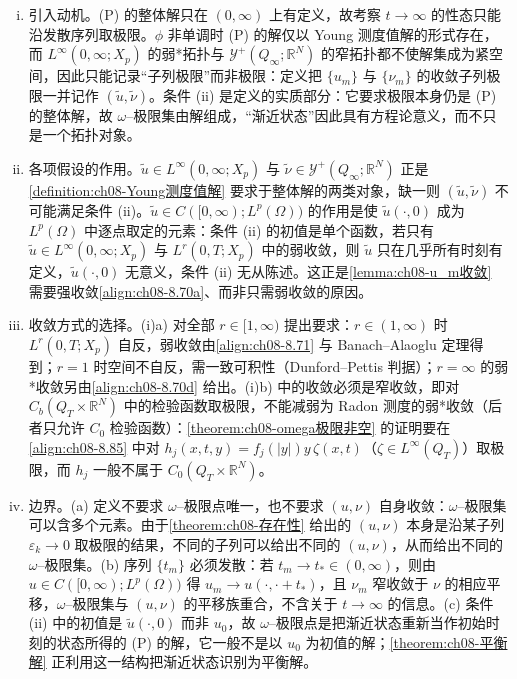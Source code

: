 \documentclass[../../main.tex]{subfiles}%
\begin{document}
\begin{remark}\label{remark:ch08-omega极限点}
\begin{enumerate}[(i)]
\item 引入动机。(P) 的整体解只在 $(0,\infty)$ 上有定义，故考察 $t\to\infty$ 的性态只能沿发散序列取极限。$\phi$ 非单调时 (P) 的解仅以 Young 测度值解的形式存在，而 $L^\infty(0,\infty;X_p)$ 的弱*拓扑与 $\mathcal{Y}^+(Q_\infty;\mathbb{R}^N)$ 的窄拓扑都不使解集成为紧空间，因此只能记录“子列极限”而非极限：定义把 $\{u_m\}$ 与 $\{\nu_m\}$ 的收敛子列极限一并记作 $(\tilde u,\tilde\nu)$。条件 (ii) 是定义的实质部分：它要求极限本身仍是 (P) 的整体解，故 $\omega$--极限集由解组成，“渐近状态”因此具有方程论意义，而不只是一个拓扑对象。
\item 各项假设的作用。$\tilde u\in L^\infty(0,\infty;X_p)$ 与 $\tilde\nu\in\mathcal{Y}^+(Q_\infty;\mathbb{R}^N)$ 正是\cref{definition:ch08-Young测度值解} 要求于整体解的两类对象，缺一则 $(\tilde u,\tilde\nu)$ 不可能满足条件 (ii)。$\tilde u\in C([0,\infty);L^p(\Omega))$ 的作用是使 $\tilde u(\cdot,0)$ 成为 $L^p(\Omega)$ 中逐点取定的元素：条件 (ii) 的初值是单个函数，若只有 $\tilde u\in L^\infty(0,\infty;X_p)$ 与 $L^r(0,T;X_p)$ 中的弱收敛，则 $\tilde u$ 只在几乎所有时刻有定义，$\tilde u(\cdot,0)$ 无意义，条件 (ii) 无从陈述。这正是\cref{lemma:ch08-u_m收敛} 需要强收敛\eqref{align:ch08-8.70a}、而非只需弱收敛的原因。
\item 收敛方式的选择。(i)a) 对全部 $r\in[1,\infty)$ 提出要求：$r\in(1,\infty)$ 时 $L^r(0,T;X_p)$ 自反，弱收敛由\eqref{align:ch08-8.71} 与 Banach--Alaoglu 定理得到；$r=1$ 时空间不自反，需一致可积性（Dunford--Pettis 判据）；$r=\infty$ 的弱*收敛另由\eqref{align:ch08-8.70d} 给出。(i)b) 中的收敛必须是窄收敛，即对 $C_b(Q_T\times\mathbb{R}^N)$ 中的检验函数取极限，不能减弱为 Radon 测度的弱*收敛（后者只允许 $C_0$ 检验函数）：\cref{theorem:ch08-omega极限非空} 的证明要在\eqref{align:ch08-8.85} 中对 $h_j(x,t,y)=f_j(|y|)y\,\zeta(x,t)$（$\zeta\in L^\infty(Q_T)$）取极限，而 $h_j$ 一般不属于 $C_0(Q_T\times\mathbb{R}^N)$。
\item 边界。(a) 定义不要求 $\omega$--极限点唯一，也不要求 $(u,\nu)$ 自身收敛：$\omega$--极限集可以含多个元素。由于\cref{theorem:ch08-存在性} 给出的 $(u,\nu)$ 本身是沿某子列 $\varepsilon_k\to0$ 取极限的结果，不同的子列可以给出不同的 $(u,\nu)$，从而给出不同的 $\omega$--极限集。(b) 序列 $\{t_m\}$ 必须发散：若 $t_m\to t_*\in(0,\infty)$，则由 $u\in C([0,\infty);L^p(\Omega))$ 得 $u_m\to u(\cdot,\cdot+t_*)$，且 $\nu_m$ 窄收敛于 $\nu$ 的相应平移，$\omega$--极限集与 $(u,\nu)$ 的平移族重合，不含关于 $t\to\infty$ 的信息。(c) 条件 (ii) 中的初值是 $\tilde u(\cdot,0)$ 而非 $u_0$，故 $\omega$--极限点是把渐近状态重新当作初始时刻的状态所得的 (P) 的解，它一般不是以 $u_0$ 为初值的解；\cref{theorem:ch08-平衡解} 正利用这一结构把渐近状态识别为平衡解。
\end{enumerate}
\end{remark}
\end{document}
